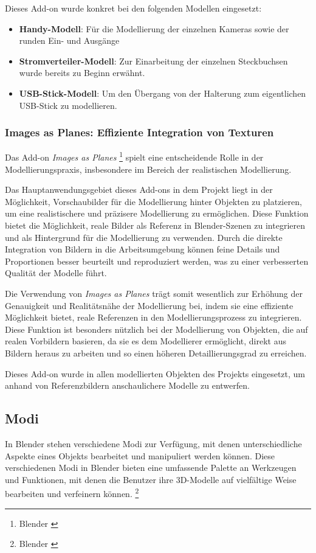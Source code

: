Dieses Add-on wurde konkret bei den folgenden Modellen eingesetzt:
\begin{itemize}
    \item \textbf{Handy-Modell}: Für die Modellierung der einzelnen Kameras sowie der runden Ein- und Ausgänge
    \item \textbf{Stromverteiler-Modell}: Zur Einarbeitung der einzelnen Steckbuchsen wurde bereits zu Beginn erwähnt.
    \item \textbf{USB-Stick-Modell}: Um den Übergang von der Halterung zum eigentlichen USB-Stick zu modellieren.
\end{itemize}

\subsubsection{Images as Planes: Effiziente Integration von Texturen}
Das Add-on \textit{Images as Planes} \footnote{Blender \cite{Images as Planes}} spielt eine entscheidende Rolle in der Modellierungspraxis, insbesondere im Bereich der realistischen Modellierung.

Das Hauptanwendungsgebiet dieses Add-ons in dem Projekt liegt in der Möglichkeit, Vorschaubilder für die Modellierung hinter Objekten zu platzieren, um eine realistischere und präzisere Modellierung zu ermöglichen. Diese Funktion bietet die Möglichkeit, reale Bilder als Referenz in Blender-Szenen zu integrieren und als Hintergrund für die Modellierung zu verwenden. Durch die direkte Integration von Bildern in die Arbeitsumgebung können feine Details und Proportionen besser beurteilt und reproduziert werden, was zu einer verbesserten Qualität der Modelle führt.

Die Verwendung von \textit{Images as Planes} trägt somit wesentlich zur Erhöhung der Genauigkeit und Realitätsnähe der Modellierung bei, indem sie eine effiziente Möglichkeit bietet, reale Referenzen in den Modellierungsprozess zu integrieren. Diese Funktion ist besonders nützlich bei der Modellierung von Objekten, die auf realen Vorbildern basieren, da sie es dem Modellierer ermöglicht, direkt aus Bildern heraus zu arbeiten und so einen höheren Detaillierungsgrad zu erreichen.

Dieses Add-on wurde in allen modellierten Objekten des Projekts eingesetzt, um anhand von Referenzbildern anschaulichere Modelle zu entwerfen.

\subsection{Modi}
In Blender stehen verschiedene Modi zur Verfügung, mit denen unterschiedliche Aspekte eines Objekts bearbeitet und manipuliert werden können. Diese verschiedenen Modi in Blender bieten eine umfassende Palette an Werkzeugen und Funktionen, mit denen die Benutzer ihre 3D-Modelle auf vielfältige Weise bearbeiten und verfeinern können. \footnote{Blender \cite{Modi}}

